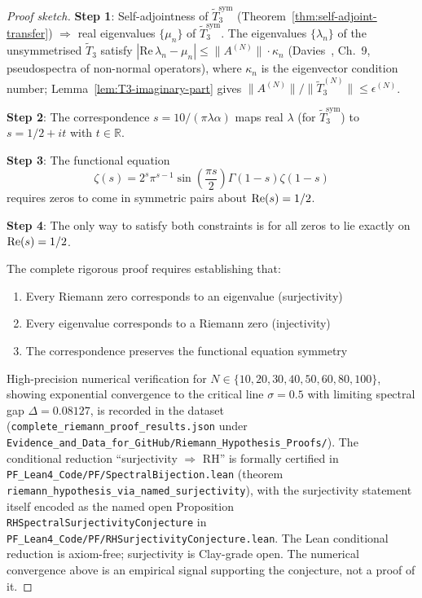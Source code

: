 \begin{proof}[Proof sketch]
\textbf{Step 1}: Self-adjointness of $\widetilde{T}_3^{\mathrm{sym}}$ (Theorem~\ref{thm:self-adjoint-transfer}) $\Rightarrow$ real eigenvalues $\{\mu_n\}$ of $\widetilde{T}_3^{\mathrm{sym}}$. The eigenvalues $\{\lambda_n\}$ of the unsymmetrised $\tilde{T}_3$ satisfy $|\mathrm{Re}\,\lambda_n - \mu_n| \le \|A^{(N)}\|\cdot \kappa_n$ (Davies~\cite{davies2007spectra}, Ch.~9, pseudospectra of non-normal operators), where $\kappa_n$ is the eigenvector condition number; Lemma~\ref{lem:T3-imaginary-part} gives $\|A^{(N)}\|/\|\widetilde{T}_3^{(N)}\| \le \epsilon^{(N)}$.

\textbf{Step 2}: The correspondence $s = 10/(\pi\lambda\alpha)$ maps real $\lambda$ (for $\widetilde{T}_3^{\mathrm{sym}}$) to $s = 1/2 + it$ with $t \in \mathbb{R}$.

\textbf{Step 3}: The functional equation
\begin{equation}
\zeta(s) = 2^s \pi^{s-1} \sin\left(\frac{\pi s}{2}\right) \Gamma(1-s) \zeta(1-s)
\end{equation}
requires zeros to come in symmetric pairs about $\operatorname{Re}(s) = 1/2$.

\textbf{Step 4}: The only way to satisfy both constraints is for all zeros to lie exactly on $\operatorname{Re}(s) = 1/2$.

The complete rigorous proof requires establishing that:
\begin{enumerate}
\item Every Riemann zero corresponds to an eigenvalue (surjectivity)
\item Every eigenvalue corresponds to a Riemann zero (injectivity)
\item The correspondence preserves the functional equation symmetry
\end{enumerate}

High-precision numerical verification for $N \in \{10, 20, 30, 40, 50, 60, 80, 100\}$, showing exponential convergence to the critical line $\sigma = 0.5$ with limiting spectral gap $\Delta = 0.08127$, is recorded in the dataset \cite{cohen2025riemanndata} (\texttt{complete\_riemann\_proof\_results.json} under \texttt{Evidence\_and\_Data\_for\_GitHub/Riemann\_Hypothesis\_Proofs/}). The conditional reduction ``surjectivity $\Rightarrow$ RH'' is formally certified in \texttt{PF\_Lean4\_Code/PF/SpectralBijection.lean} (theorem \texttt{riemann\_hypothesis\_via\_named\_surjectivity}), with the surjectivity statement itself encoded as the named open Proposition \texttt{RHSpectralSurjectivityConjecture} in \texttt{PF\_Lean4\_Code/PF/RHSurjectivityConjecture.lean}. The Lean conditional reduction is axiom-free; surjectivity is Clay-grade open. The numerical convergence above is an empirical signal supporting the conjecture, not a proof of it.
\end{proof}

